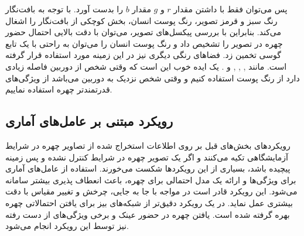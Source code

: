 \noindent
پس می‌توان فقط با داشتن مقدار $r$ و $g$ مقدار $b$ را بدست آورد. با توجه به بافت‌نگار  رنگ سبز و قرمز تصویر، رنگ پوست انسان، بخش کوچکی از بافت‌نگار را اشغال می‌کند. بنابراین با بررسی پیکسل‌های تصویر، می‌توان با دقت بالایی احتمال حضور چهره در تصویر را تشخیص داد و رنگ پوست انسان را می‌توان به راحتی با یک تابع گوسی تخمین زد. فضاهای رنگی دیگری نیز در این زمینه مورد استفاده قرار گرفته است. مانند , , , و . یک ایده خوب این است که وقتی شخص از دوربین فاصله زیادی دارد از رنگ پوست استفاده کنیم و وقتی شخص نزدیک به دوربین می‌باشد از ویژگی‌های قدرتمندتر چهره استفاده نماییم.

\subsection{رویکرد مبتنی بر عامل‌های آماری}
رویکرد‌های بخش‌های قبل بر روی اطلاعات استخراج شده از تصاویر چهره در شرایط آزمایشگاهی تکیه می‌کنند و اگر یک تصویر چهره در شرایط کنترل نشده و پس زمینه پیچیده باشد، بسیاری از این رویکردها شکست می‌خورند. استفاده از عامل‌های آماری  برای ویژگی‌ها و ارائه یک مدل احتمالی برای چهره، باعث انعطاف پذیری بیشتر سامانه می‌شود. این رویکرد قادر است در مواجه با جا به جایی، چرخش و تغییر مقیاس با دقت بیشتری عمل نماید. در یک رویکرد دقیق‌تر از شبکه‌های بیز  برای یافتن احتمالاتی چهره بهره گرفته شده است. یافتن چهره در حضور عینک و برخی ویژگی‌های از دست رفته نیز توسط این رویکرد انجام می‌شود.
%
%
%

